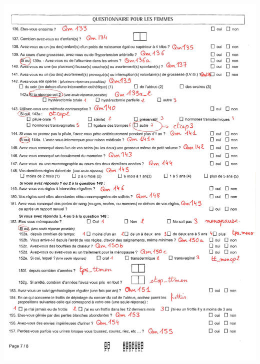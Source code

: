\documentclass{book}
\begin{document}
\includegraphics[scale=.28]{quest_ipc-7.png}
\newpage
\end{document}
